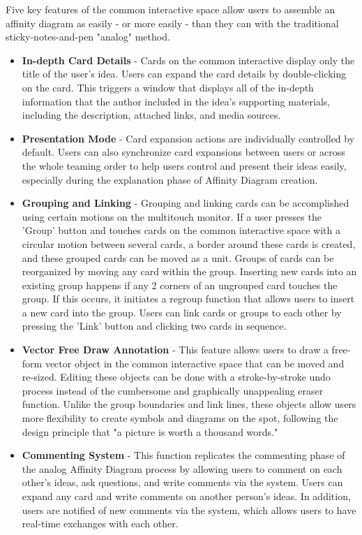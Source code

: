 \documentclass{sigchi}
\begin{document}
Five key features of the common interactive space allow users to assemble an affinity diagram as easily - or more easily - than they can with the traditional sticky-notes-and-pen "analog" method.

\begin{itemize}


\item  \textbf{In-depth Card Details} - Cards on the common interactive display only the title of the user's idea. Users can expand the card details by double-clicking on the card. This triggers a window that displays all of the in-depth information that the author included in the idea's supporting materials, including the description, attached links, and media sources. 
\item  \textbf{Presentation Mode} - Card expansion actions are individually controlled by default. Users can also synchronize card expansions between users or across the whole teaming order to help users control and present their ideas easily, especially during the explanation phase of Affinity Diagram creation.
\item \textbf{Grouping and Linking} -  Grouping and linking cards can be accomplished using certain motions on the multitouch monitor. If a user presses the 'Group' button and touches cards on the common interactive space with a circular motion between several cards, a border around these cards is created, and these grouped cards can be moved as a unit. Groups of cards can be reorganized by moving any card within the group. Inserting new cards into an existing group happens if any 2 corners of an ungrouped card touches the group. If this occurs, it initiates a regroup function that allows users to insert a new card into the group. Users can link cards or groups to each other by pressing the 'Link' button and clicking two cards in sequence.  
\item \textbf{Vector Free Draw Annotation} - This feature allows users to draw a free-form vector object in the common interactive space that can be moved and re-sized. Editing these objects can be done with a stroke-by-stroke undo process instead of the cumbersome and graphically unappealing eraser function. Unlike the group boundaries and link lines, these objects allow users more flexibility to create symbols and diagrams on the spot, following the design principle that "a picture is worth a thousand words."  
\item \textbf{Commenting System} - This function replicates the commenting phase of the analog Affinity Diagram process by allowing users to comment on each other's ideas, ask questions, and write comments via the system. Users can expand any card and write comments on another person's ideas. In addition, users are notified of new comments via the system, which allows users to have real-time exchanges with each other. 

\end{itemize}
\end{document}
